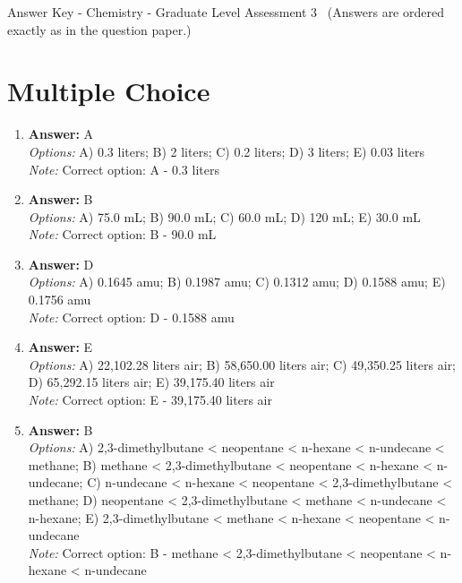 \documentclass[12pt]{article}
\begin{document}
\begin{center}
Answer Key - Chemistry - Graduate Level Assessment 3 \
\small (Answers are ordered exactly as in the question paper.)
\end{center}

\section*{Multiple Choice}
\begin{enumerate}[label=\arabic*.]
\item \textbf{Answer:} A
\\ \textit{Options:} A) 0.3 liters; B) 2 liters; C) 0.2 liters; D) 3 liters; E) 0.03 liters
\\ \textit{Note:} Correct option: A - 0.3 liters
\item \textbf{Answer:} B
\\ \textit{Options:} A) 75.0 mL; B) 90.0 mL; C) 60.0 mL; D) 120 mL; E) 30.0 mL
\\ \textit{Note:} Correct option: B - 90.0 mL
\item \textbf{Answer:} D
\\ \textit{Options:} A) 0.1645 amu; B) 0.1987 amu; C) 0.1312 amu; D) 0.1588 amu; E) 0.1756 amu
\\ \textit{Note:} Correct option: D - 0.1588 amu
\item \textbf{Answer:} E
\\ \textit{Options:} A) 22,102.28 liters air; B) 58,650.00 liters air; C) 49,350.25 liters air; D) 65,292.15 liters air; E) 39,175.40 liters air
\\ \textit{Note:} Correct option: E - 39,175.40 liters air
\item \textbf{Answer:} B
\\ \textit{Options:} A) 2,3-dimethylbutane \textless{} neopentane \textless{} n-hexane \textless{} n-undecane \textless{} methane; B) methane \textless{} 2,3-dimethylbutane \textless{} neopentane \textless{} n-hexane \textless{} n-undecane; C) n-undecane \textless{} n-hexane \textless{} neopentane \textless{} 2,3-dimethylbutane \textless{} methane; D) neopentane \textless{} 2,3-dimethylbutane \textless{} methane \textless{} n-undecane \textless{} n-hexane; E) 2,3-dimethylbutane \textless{} methane \textless{} n-hexane \textless{} neopentane \textless{} n-undecane
\\ \textit{Note:} Correct option: B - methane \textless{} 2,3-dimethylbutane \textless{} neopentane \textless{} n-hexane \textless{} n-undecane
\end{enumerate}
\end{document}
